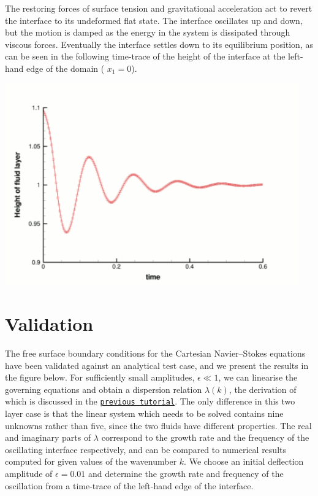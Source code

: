 The restoring forces of surface tension and gravitational acceleration act to revert the interface to its undeformed flat state. The interface oscillates up and down, but the motion is damped as the energy in the system is dissipated through viscous forces. Eventually the interface settles down to its equilibrium position, as can be seen in the following time-\/trace of the height of the interface at the left-\/hand edge of the domain ( $ x_1 = 0 $).

 
\begin{DoxyImage}
\includegraphics[width=0.95\textwidth]{two_layer_interface_trace}
\end{DoxyImage}




 

\hypertarget{index_validation}{}\section{Validation}\label{index_validation}
The free surface boundary conditions for the Cartesian Navier--Stokes equations have been validated against an analytical test case, and we present the results in the figure below. For sufficiently small amplitudes, $ \epsilon \ll 1 $, we can linearise the governing equations and obtain a dispersion relation $ \lambda(k) $, the derivation of which is discussed in the \href{../../single_layer_free_surface/html/index.html#validation}{\tt previous tutorial}. The only difference in this two layer case is that the linear system which needs to be solved contains nine unknowns rather than five, since the two fluids have different properties. The real and imaginary parts of $ \lambda $ correspond to the growth rate and the frequency of the oscillating interface respectively, and can be compared to numerical results computed for given values of the wavenumber $ k $. We choose an initial deflection amplitude of $ \epsilon = 0.01 $ and determine the growth rate and frequency of the oscillation from a time-\/trace of the left-\/hand edge of the interface.

